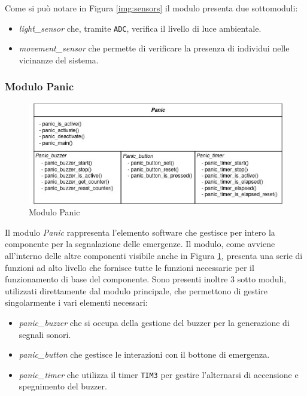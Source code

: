 \documentclass{article}
\begin{document}
	\noindent Come si pu\`o notare in Figura \ref{img:sensors} il modulo presenta due sottomoduli:
	\begin{itemize}
			\item \textit{light\_sensor} che, tramite \texttt{ADC}, verifica il livello di luce ambientale.
			\item \textit{movement\_sensor} che permette di verificare la presenza di individui nelle vicinanze del sistema.
	\end{itemize}
	\newpage
	
	\subsubsection{Modulo Panic}
	\begin{figure}[ht]
		\centering
		\includegraphics[scale=0.4]{./images/Panic.jpg}
		\caption{Modulo Panic}
		\label{img:panic}
	\end{figure}
	\noindent Il modulo \textit{Panic} rappresenta l'elemento software che gestisce per intero la componente per la segnalazione delle emergenze.
	Il modulo, come avviene all'interno delle altre componenti visibile anche in Figura \ref{img:panic}, presenta una serie di funzioni ad alto livello che fornisce tutte le funzioni necessarie per il funzionamento di base del componente.
	Sono presenti inoltre 3 sotto moduli, utilizzati direttamente dal modulo principale, che permettono di gestire singolarmente i vari elementi necessari:
	\begin{itemize}
		\item \textit{panic\_buzzer} che si occupa della gestione del buzzer per la generazione di segnali sonori.
		\item \textit{panic\_button} che gestisce le interazioni con il bottone di emergenza.
		\item \textit{panic\_timer} che utilizza il timer \texttt{TIM3} per gestire l'alternarsi di accensione e spegnimento del buzzer.
	\end{itemize}
	
\end{document}
